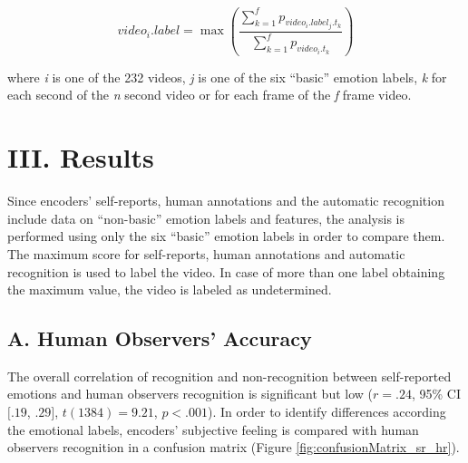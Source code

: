 \documentclass[conference,final,]{IEEEtran}
\begin{document}
\begin{equation}
\label{eq:3}
video_{i}.label = \max\left(\frac{\sum_{k=1}^{f}p_{video_{i}.label_{j}.t_{k}}}{\sum_{k=1}^{f}p_{video_{i}.t_{k}}}\right)
\end{equation}

where \emph{i} is one of the 232 videos, \emph{j} is one of the six
``basic'' emotion labels, \emph{k} for each second of the \emph{n}
second video or for each frame of the \emph{f} frame video.

\hypertarget{iii.-results}{%
\section{III. Results}\label{iii.-results}}

Since encoders' self-reports, human annotations and the automatic
recognition include data on ``non-basic'' emotion labels and features,
the analysis is performed using only the six ``basic'' emotion labels in
order to compare them. The maximum score for self-reports, human
annotations and automatic recognition is used to label the video. In
case of more than one label obtaining the maximum value, the video is
labeled as undetermined.

\hypertarget{a.-human-observers-accuracy}{%
\subsection{A. Human Observers'
Accuracy}\label{a.-human-observers-accuracy}}

The overall correlation of recognition and non-recognition between
self-reported emotions and human observers recognition is significant
but low (\(r = .24\), 95\% CI \([.19\), \(.29]\), \(t(1384) = 9.21\),
\(p < .001\)). In order to identify differences according the emotional
labels, encoders' subjective feeling is compared with human observers
recognition in a confusion matrix (Figure
\ref{fig:confusionMatrix_sr_hr}).
\end{document}
